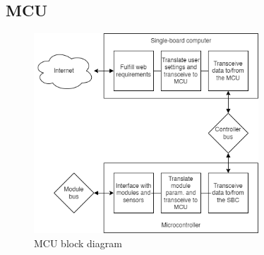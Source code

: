 \subsection{MCU}
\begin{figure}[H]
    \caption{MCU block diagram}
    \centering
    \includegraphics[width=0.75\textwidth]{block-diagrams/images/mcu_block_diagram.png}
\end{figure}